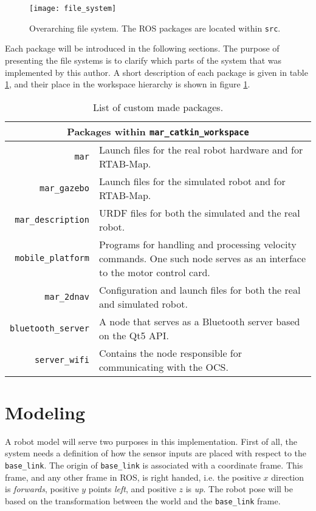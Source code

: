 \begin{figure}[h]
	\centering
	\texttt{[image: file\_system]}
	\caption{Overarching file system. The \ac{ROS} packages are located within \texttt{src}.}
	\label{fig:file_system}
\end{figure}

Each package will be introduced in the following sections. The purpose of presenting the file systems is to clarify which parts of the system that was implemented by this author. A short description of each package is given in table \ref{tab:list_packages}, and their place in the workspace hierarchy is shown in figure \ref{fig:file_system}.

\begin{table}
	\centering
	\begin{tabular}{ r p{8.5cm} }
		\hline
		\multicolumn{2}{c}{Packages within \texttt{mar\_catkin\_workspace}}\\
		\hline
		\texttt{mar} & Launch files for the real robot hardware and for \ac{RTAB-Map}.\\
		\texttt{mar\_gazebo} & Launch files for the simulated robot and for \ac{RTAB-Map}.\\
		\texttt{mar\_description} & \ac{URDF} files for both the simulated and the real robot.\\
		\texttt{mobile\_platform} & Programs for handling and processing velocity commands. One such node serves as an interface to the motor control card.\\
		\texttt{mar\_2dnav} & Configuration and launch files for both the real and simulated robot.\\
		\texttt{bluetooth\_server} & A node that serves as a Bluetooth server based on the Qt5 API.\\
		\texttt{server\_wifi} & Contains the node responsible for communicating with the \ac{OCS}.\\
		\hline
	\end{tabular}
	\caption{List of custom made packages.}\label{tab:list_packages}
\end{table}


\section{Modeling}
\label{sec:modeling}
A robot model will serve two purposes in this implementation. First of all, the system needs a definition of how the sensor inputs are placed with respect to the \texttt{base\_link}. The origin of \texttt{base\_link} is associated  with a coordinate frame. This frame, and any other frame in \ac{ROS}, is right handed, i.e. the positive $x$ direction is \textit{forwards}, positive $y$ points \textit{left}, and positive $z$ is \textit{up}. The robot pose will be based on the transformation between the world and the \texttt{base\_link} frame. 

